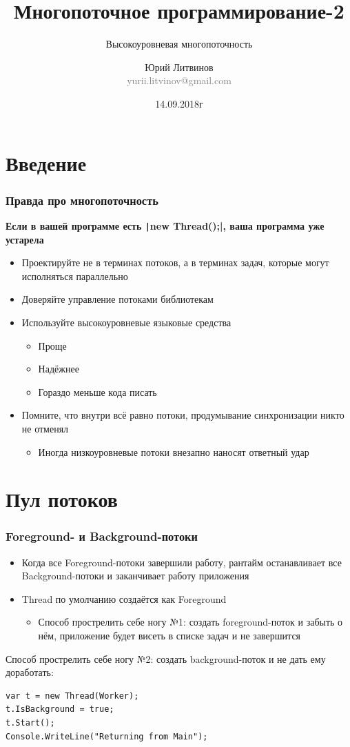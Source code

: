 \documentclass[xetex,mathserif,serif]{beamer}
\title{Многопоточное программирование-2}
\subtitle{Высокоуровневая многопоточность}
\author[Юрий Литвинов]{Юрий Литвинов\\\small{\textcolor{gray}{yurii.litvinov@gmail.com}}}
\date{14.09.2018г}
\begin{document}
	\frame{\titlepage}

	\section{Введение}

	\begin{frame}
		\frametitle{Правда про многопоточность}
		\textbf{Если в вашей программе есть \texttt|new Thread();|, ваша программа уже устарела}
		\begin{itemize}
			\item Проектируйте не в терминах потоков, а в терминах задач, которые могут исполняться параллельно
			\item Доверяйте управление потоками библиотекам
			\item Используйте высокоуровневые языковые средства
			\begin{itemize}
				\item Проще
				\item Надёжнее
				\item Гораздо меньше кода писать
			\end{itemize}
			\item Помните, что внутри всё равно потоки, продумывание синхронизации никто не отменял
			\begin{itemize}
				\item Иногда низкоуровневые потоки внезапно наносят ответный удар
			\end{itemize}
		\end{itemize}
	\end{frame}

	\section{Пул потоков}

	\begin{frame}[fragile]
		\frametitle{Foreground- и Background-потоки}
		\begin{itemize}
			\item Когда все Foreground-потоки завершили работу, рантайм останавливает все Background-потоки и заканчивает работу приложения
			\item Thread по умолчанию создаётся как Foreground
			\begin{itemize}
				\item Способ прострелить себе ногу №1: создать foreground-поток и забыть о нём, приложение будет висеть в списке задач и не завершится
			\end{itemize}
		\end{itemize}
		\vspace{5mm}
		Способ прострелить себе ногу №2: создать background-поток и не дать ему доработать:
		\begin{verbatim}
var t = new Thread(Worker);
t.IsBackground = true;
t.Start();
Console.WriteLine("Returning from Main");
		\end{verbatim}
	\end{frame}
\end{document}
